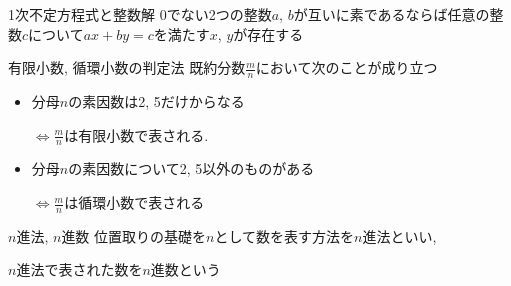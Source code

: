 \documentclass[aspectratio=169, 12pt]{beamer} %
\begin{document}
\begin{frame}{1次不定方程式と整数解}
    0でない2つの整数$a$, $b$が互いに素であるならば任意の整数$c$について$ax+by=c$を満たす$x$, $y$が存在する
\end{frame}
\begin{frame}{有限小数, 循環小数の判定法}
    既約分数$\frac{m}{n}$において次のことが成り立つ
    \begin{itemize}
        \item 分母$n$の素因数は2, 5だけからなる \par
              $\Leftrightarrow \frac{m}{n}$は有限小数で表される.
        \item  分母$n$の素因数について2, 5以外のものがある \par
              $\Leftrightarrow \frac{m}{n}$は循環小数で表される
    \end{itemize}
\end{frame}
\begin{frame}{$n$進法, $n$進数}
    位置取りの基礎を$n$として数を表す方法を$n$進法といい,\par $n$進法で表された数を$n$進数という
\end{frame}
\end{document}
